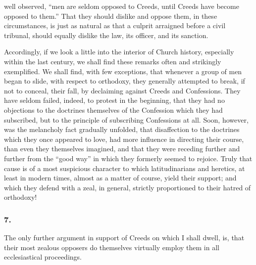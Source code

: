 \documentclass[
]{book}
\begin{document}
well observed, ``men are seldom opposed to Creeds, until Creeds have become opposed to them.'' That they should dislike and oppose them, in these circumstances, is just as natural as that a culprit arraigned before a civil tribunal, should equally dislike the law, its officer, and its sanction.

Accordingly, if we look a little into the interior of Church history, especially within the last century, we shall find these remarks often and strikingly exemplified. We shall find, with few exceptions, that whenever a group of men began to slide, with respect to orthodoxy, they generally attempted to break, if not to conceal, their fall, by declaiming against Creeds and Confessions. They have seldom failed, indeed, to protest in the beginning, that they had no objections to the doctrines themselves of the Confession which they had subscribed, but to the principle of subscribing Confessions at all. Soon, however, was the melancholy fact gradually unfolded, that disaffection to the doctrines which they once appeared to love, had more influence in directing their course, than even they themselves imagined, and that they were receding further and further from the ``good way'' in which they formerly seemed to rejoice. Truly that cause is of a most suspicious character to which latitudinarians and heretics, at least in modern times, almost as a matter of course, yield their support; and which they defend with a zeal, in general, strictly proportioned to their hatred of orthodoxy!

\hypertarget{section-6}{%
\subsubsection*{7.}\label{section-6}}

The only further argument in support of Creeds on which I shall dwell, is, that their most zealous opposers do themselves virtually employ them in all ecclesiastical proceedings.
\end{document}
